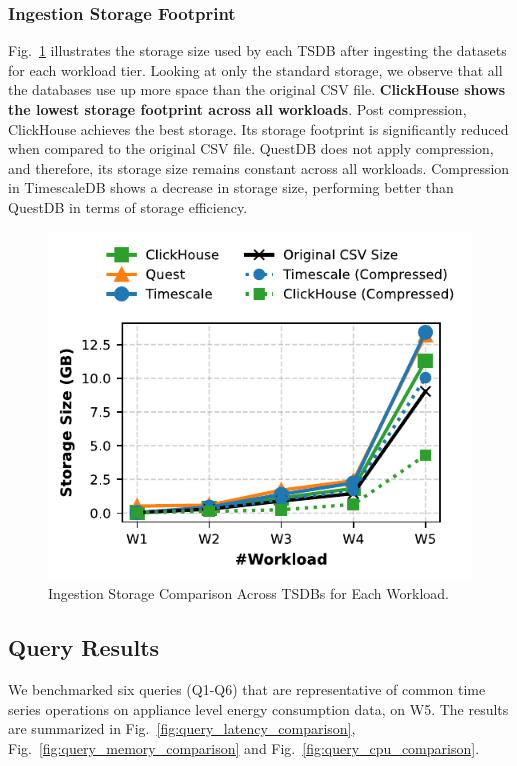 \documentclass[conference]{IEEEtran}
\begin{document}
\subsubsection{Ingestion Storage Footprint}
Fig.~\ref{fig:ingestion_storage_comparison} illustrates the storage size used by each TSDB after ingesting the datasets for each workload tier. Looking at only the standard storage, we observe that all the databases use up more space than the original CSV file. \textbf{ClickHouse shows the lowest storage footprint across all workloads}. Post compression, ClickHouse achieves the best storage. Its storage footprint is significantly reduced when compared to the original CSV file. QuestDB does not apply compression, and therefore, its storage size remains constant across all workloads. Compression in TimescaleDB shows a decrease in storage size, performing better than QuestDB in terms of storage efficiency.
\begin{figure}[tb]
\centering
\includegraphics[width=0.8\linewidth]{3_ing_storage_plot.pdf}
\caption{Ingestion Storage Comparison Across TSDBs for Each Workload.}
\label{fig:ingestion_storage_comparison}
\end{figure}

\subsection{Query Results}
We benchmarked six queries (Q1-Q6) that are representative of common time series operations on appliance level energy consumption data, on W5. The results are summarized in Fig.~\ref{fig:query_latency_comparison}, Fig.~\ref{fig:query_memory_comparison} and Fig.~\ref{fig:query_cpu_comparison}.
\end{document}
